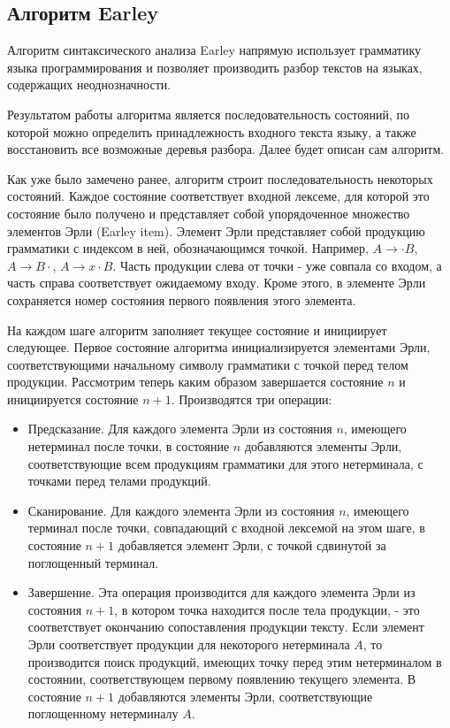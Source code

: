 \subsection{Алгоритм Earley}
Алгоритм синтаксического анализа Earley напрямую использует грамматику языка программирования и позволяет производить разбор текстов на языках, содержащих неоднозначности.

Результатом работы алгоритма является последовательность состояний, по которой можно определить принадлежность входного текста языку, а также восстановить все возможные деревья разбора. Далее будет описан сам алгоритм.

Как уже было замечено ранее, алгоритм строит последовательность некоторых состояний. Каждое состояние соответствует входной лексеме, для которой это состояние было получено и представляет собой упорядоченное множество элементов Эрли (Earley item). Элемент Эрли представляет собой продукцию грамматики с индексом в ней, обозначающимся точкой. Например, $A \to \cdot B$, $A \to B \cdot $, $A \to x \cdot B$. Часть продукции слева от точки - уже совпала со входом, а часть справа соответствует ожидаемому входу. Кроме этого, в элементе Эрли сохраняется номер состояния первого появления этого элемента.

На каждом шаге алгоритм заполняет текущее состояние и инициирует следующее. Первое состояние алгоритма инициализируется элементами Эрли, соответствующими начальному символу грамматики с точкой перед телом продукции. Рассмотрим теперь каким образом завершается состояние $n$ и инициируется состояние $n+1$. Производятся три операции:

\begin{itemize}

\item Предсказание. Для каждого элемента Эрли из состояния $n$, имеющего нетерминал после точки, в состояние $n$ добавляются элементы Эрли, соответствующие всем продукциям грамматики для этого нетерминала, с точками перед телами продукций.

\item Сканирование. Для каждого элемента Эрли из состояния $n$, имеющего терминал после точки, совпадающий с входной лексемой на этом шаге, в состояние $n+1$ добавляется элемент Эрли, с точкой сдвинутой за поглощенный терминал.

\item Завершение. Эта операция производится для каждого элемента Эрли из состояния $n+1$, в котором точка находится после тела продукции, - это соответствует окончанию сопоставления продукции тексту. Если элемент Эрли соответствует продукции для некоторого нетерминала $A$, то производится поиск продукций, имеющих точку перед этим нетерминалом в состоянии, соответствующем первому появлению текущего элемента. В состояние $n+1$ добавляются элементы Эрли, соответствующие поглощенному нетерминалу $A$.

\end{itemize}

